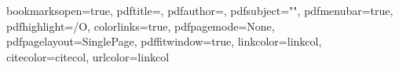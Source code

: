 \newcommand{\refname}{{\sffamily References}}
\usepackage{aecompl}


\usepackage[intoc]{nomencl}
\renewcommand{\nomname}{Notations and Acronyms}
\nomlabelwidth=25mm


 \makenomenclature
 \renewcommand{\nomgroup}[1]{%
\ifthenelse{\equal{#1}{N}}{\item[\Large\sffamily\textbf{Notations}]}{%
\ifthenelse{\equal{#1}{X}}{\item[\Large\sffamily\textbf{Acronyms}]}{}}}

\usepackage{makeidx}
 \makeindex


\makenomenclature



\usepackage{ifpdf}

\ifpdf
  \usepackage{graphicx}
  \usepackage[pagebackref,hyperindex=true]{hyperref}
\else
  \usepackage{graphicx}
  \usepackage[dvipdfm,pagebackref,hyperindex=true]{hyperref}
\fi

\graphicspath{{.}{imgs/}}

\renewcommand*{\backref}[1]{}
\renewcommand*{\backrefalt}[4]{%
\ifcase #1 %
(Not cited)%
\or
(Cited on page~#2.)%
\else
(Cited on pages~#2.)%
\fi}
\renewcommand*{\backrefsep}{, }
\renewcommand*{\backreftwosep}{ and~}
\renewcommand*{\backreflastsep}{ and~}

\usepackage{color}


\hypersetup
{
bookmarksopen=true,
pdftitle=\mytitle,
pdfauthor=\myauthor, %
pdfsubject="", %
pdfmenubar=true, %
pdfhighlight=/O, %
colorlinks=true, %
pdfpagemode=None, %
pdfpagelayout=SinglePage, %
pdffitwindow=true, %
linkcolor=linkcol, %
citecolor=citecol, %
urlcolor=linkcol %
}

